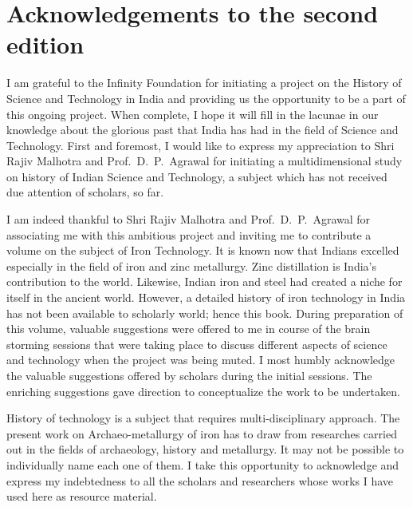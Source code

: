 \chapter*{Acknowledgements to the second edition}\label{acknowledgement}


\vspace{-.7cm}

I am grateful to the Infinity Foundation for initiating a project on the History of Science and Technology in India and providing us the opportunity to be a part of this ongoing project. When complete, I hope it will fill in the lacunae in our knowledge about the glorious past that India has had in the field of Science and Technology. First and foremost,  I would like to express my appreciation to Shri Rajiv Malhotra and Prof.~D.~P.~Agrawal for initiating a multidimensional study on history of Indian Science and Technology, a subject which has not received due attention of scholars, so far. 

I am indeed thankful to Shri Rajiv Malhotra and Prof.~D.~P.~Agrawal for associating me with this ambitious project and inviting me to contribute a volume on the subject of Iron Technology. It is known now that Indians excelled especially in the field of iron and zinc metallurgy. Zinc distillation is India’s contribution to the world. Likewise, Indian iron and steel had created a niche for itself in the ancient world.  However, a detailed history of iron technology in India has not been available to scholarly world; hence this book. During preparation of this volume, valuable suggestions were offered to me in course of the brain storming sessions that were taking place to discuss different aspects of science and technology when the project was being muted. I most humbly acknowledge the valuable suggestions offered by scholars during the initial sessions. The enriching suggestions gave direction to conceptualize the work to be undertaken. 

History of technology is a subject that requires multi-disciplinary approach. The present work on Archaeo-metallurgy of iron has to draw from researches carried out in the fields of archaeology, history and metallurgy. It may not be possible to individually name each one of them. I take this opportunity to acknowledge and express my indebtedness to all the scholars and researchers whose works I have used here as resource material. 

